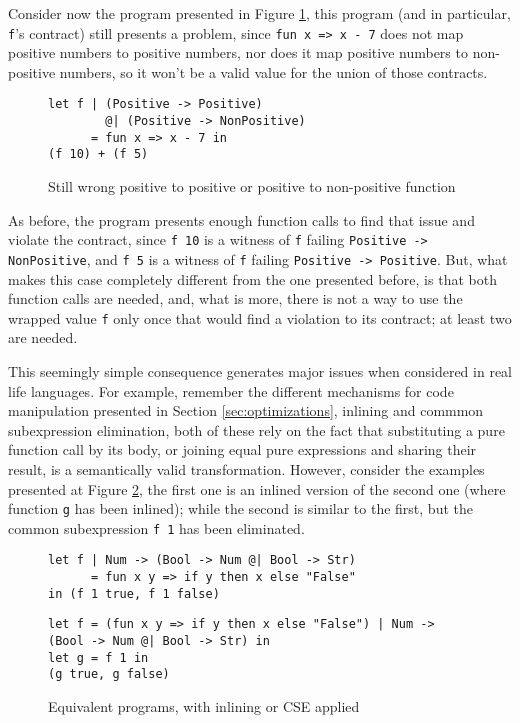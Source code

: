 \documentclass[sigplan,10pt,review,anonymous]{acmart}
\newcommand{\nickel}[1]{\lstinline[language=nickel]{#1}}
\begin{document}
Consider now the program presented in Figure \ref{fig:wrong-union-function},
this program (and in particular, \nickel{f}'s contract) still presents a problem,
since \nickel{fun x => x - 7} does not map positive numbers to positive numbers,
nor does it map positive numbers to non-positive numbers, so it won't be a valid
value for the union of those contracts.


\begin{figure}[h]
\begin{lstlisting}[language=nickel]
let f | (Positive -> Positive)
        @| (Positive -> NonPositive)
      = fun x => x - 7 in
(f 10) + (f 5)
\end{lstlisting}
\caption{Still wrong positive to positive or positive to non-positive function}
\label{fig:wrong-union-function}
\end{figure}

As before, the program presents enough function calls to find that issue
and violate the contract,
since \nickel{f 10} is a witness of \nickel{f} failing \nickel{Positive -> NonPositive},
and \nickel{f 5} is a witness of \nickel{f} failing \nickel{Positive -> Positive}.
But, what makes this case completely different from the one presented before, is that
both function calls are needed, and, what is more, there is not a way to
use the wrapped value \nickel{f} only once that would find a violation to its contract;
at least two are needed.

This seemingly simple consequence generates major issues when considered in real
life languages.
For example, remember the different mechanisms for code manipulation presented
in Section \ref{sec:optimizations}, inlining and commmon subexpression elimination,
both of these rely on the fact that substituting a pure function call by its body,
or joining equal pure expressions and sharing their result, is a semantically valid
transformation.
However, consider the examples presented at Figure \ref{fig:optimized-programs},
the first one is an inlined version of the second one (where function
\nickel{g} has been inlined); while the second is similar to the first, but
the common subexpression \nickel{f 1} has been eliminated.

\begin{figure}[h]
\begin{lstlisting}[language=nickel, title=Inlined]
let f | Num -> (Bool -> Num @| Bool -> Str)
      = fun x y => if y then x else "False"
in (f 1 true, f 1 false)
\end{lstlisting}
\begin{lstlisting}[language=nickel, title=Common Subexpression Eliminated]
let f = (fun x y => if y then x else "False") | Num -> (Bool -> Num @| Bool -> Str) in
let g = f 1 in
(g true, g false)
\end{lstlisting}
\caption{Equivalent programs, with inlining or CSE applied}
\label{fig:optimized-programs}
\end{figure}
\end{document}
